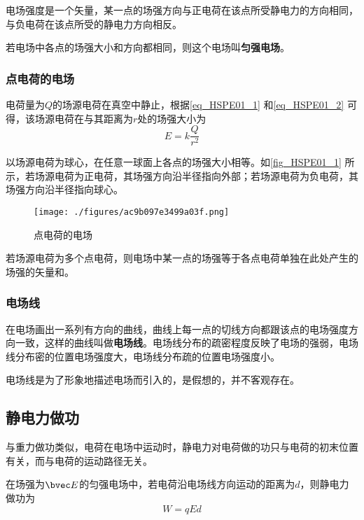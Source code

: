 电场强度是一个矢量，某一点的场强方向与正电荷在该点所受静电力的方向相同，与负电荷在该点所受的静电力方向相反。

若电场中各点的场强大小和方向都相同，则这个电场叫\textbf{匀强电场}。

\subsubsection{点电荷的电场}

电荷量为$Q$的场源电荷在真空中静止，根据\autoref{eq_HSPE01_1} 和\autoref{eq_HSPE01_2} 可得，该场源电荷在与其距离为$r$处的场强大小为
\begin{equation}
E=k\frac{Q}{r^2}
\end{equation}

以场源电荷为球心，在任意一球面上各点的场强大小相等。如\autoref{fig_HSPE01_1} 所示，若场源电荷为正电荷，其场强方向沿半径指向外部；若场源电荷为负电荷，其场强方向沿半径指向球心。

\begin{figure}[ht]
\centering
\texttt{[image: ./figures/ac9b097e3499a03f.png]}
\caption{点电荷的电场} \label{fig_HSPE01_1}
\end{figure}

若场源电荷为多个点电荷，则电场中某一点的场强等于各点电荷单独在此处产生的场强的矢量和。

\subsubsection{电场线}

在电场画出一系列有方向的曲线，曲线上每一点的切线方向都跟该点的电场强度方向一致，这样的曲线叫做\textbf{电场线}。电场线分布的疏密程度反映了电场的强弱，电场线分布密的位置电场强度大，电场线分布疏的位置电场强度小。

电场线是为了形象地描述电场而引入的，是假想的，并不客观存在。

\subsection{静电力做功}

与重力做功类似，电荷在电场中运动时，静电力对电荷做的功只与电荷的初末位置有关，而与电荷的运动路径无关。

在场强为$\bvec E$的匀强电场中，若电荷沿电场线方向运动的距离为$d$，则静电力做功为
\begin{equation}\label{eq_HSPE01_5}
W=qEd
\end{equation}

